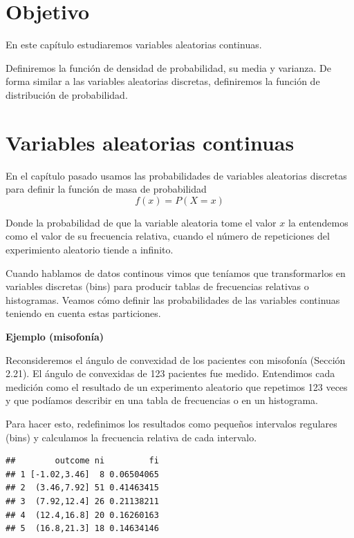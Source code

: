\documentclass[
]{book}
\begin{document}
\hypertarget{objetivo-2}{%
\section{Objetivo}\label{objetivo-2}}

En este capítulo estudiaremos variables aleatorias continuas.

Definiremos la función de densidad de probabilidad, su media y varianza. De forma similar a las variables aleatorias discretas, definiremos la función de distribución de probabilidad.

\hypertarget{variables-aleatorias-continuas-1}{%
\section{Variables aleatorias continuas}\label{variables-aleatorias-continuas-1}}

En el capítulo pasado usamos las probabilidades de variables aleatorias discretas para definir la función de masa de probabilidad \[f(x)=P(X= x)\]

Donde la probabilidad de que la variable aleatoria tome el valor \(x\) la entendemos como el valor de su frecuencia relativa, cuando el número de repeticiones del experimiento aleatorio tiende a infinito.

Cuando hablamos de datos continous vimos que teníamos que transformarlos en variables discretas (bins) para producir tablas de frecuencias relativas o histogramas. Veamos cómo definir las probabilidades de las variables continuas teniendo en cuenta estas particiones.

\textbf{Ejemplo (misofonía)}

Reconsideremos el ángulo de convexidad de los pacientes con misofonía (Sección 2.21). El ángulo de convexidas de 123 pacientes fue medido. Entendimos cada medición como el resultado de un experimento aleatorio que repetimos 123 veces y que podíamos describir en una tabla de frecuencias o en un histograma.

Para hacer esto, redefinimos los resultados como pequeños intervalos regulares (bins) y calculamos la frecuencia relativa de cada intervalo.

\begin{verbatim}
##        outcome ni         fi
## 1 [-1.02,3.46]  8 0.06504065
## 2  (3.46,7.92] 51 0.41463415
## 3  (7.92,12.4] 26 0.21138211
## 4  (12.4,16.8] 20 0.16260163
## 5  (16.8,21.3] 18 0.14634146
\end{verbatim}
\end{document}
